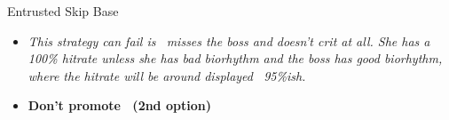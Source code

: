 \begin{battle}{Entrusted}
\newline\newline Skip Base
\prep{
    \map{
    \swap{\reyson}{\titania}
    \swap{\marcia}{\astrid}
    }
}
\begin{enumerate}
\end{enumerate}
\vspace{3mm}
\begin{itemize}
    \item \textit{This strategy can fail is \marcia\ misses the boss and doesn’t crit at all. She has a 100\% hitrate unless she has bad biorhythm and the boss has good biorhythm, where the hitrate will be around displayed ~95\%ish.}
    \vspace{3mm}
    \item \textbf{Don't promote \volke\ (2nd option)}
\end{itemize}
\end{battle}